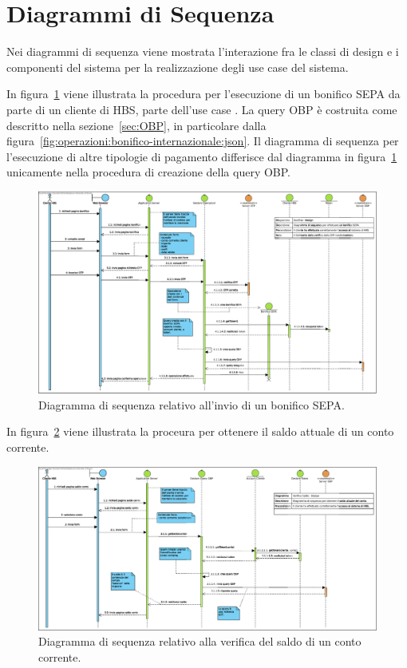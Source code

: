 
\section{Diagrammi di Sequenza}

Nei diagrammi di sequenza viene mostrata l'interazione fra le classi di design e i componenti del sistema per la realizzazione degli use case del sistema.

In figura~\ref{fig:sequenza:bonifico-sepa} viene illustrata la procedura per l'esecuzione di un bonifico SEPA da parte di un cliente di HBS, parte dell'use case \iducDISPAG.
La query OBP \`e costruita come descritto nella sezione~\ref{sec:OBP}, in particolare dalla figura~\ref{fig:operazioni:bonifico-internazionale:json}.
Il diagramma di sequenza per l'esecuzione di altre tipologie di pagamento differisce dal diagramma in figura~\ref{fig:sequenza:bonifico-sepa} unicamente nella procedura di creazione della query OBP.

\begin{figure}[h]
    \centering
	\includegraphics[width=\textheight, angle=90]{Images/Bonifico_-_Design.eps}
    \caption{Diagramma di sequenza relativo all'invio di un bonifico SEPA.}
    \label{fig:sequenza:bonifico-sepa}
\end{figure}

In figura~\ref{fig:sequenza:saldo} viene illustrata la proceura per ottenere il saldo attuale di un conto corrente.

\begin{figure}[h]
    \centering
	\includegraphics[width=\textheight, angle=90]{Images/Verifica_Saldo_-_Design.eps}
    \caption{Diagramma di sequenza relativo alla verifica del saldo di un conto corrente.}
    \label{fig:sequenza:saldo}
\end{figure}

